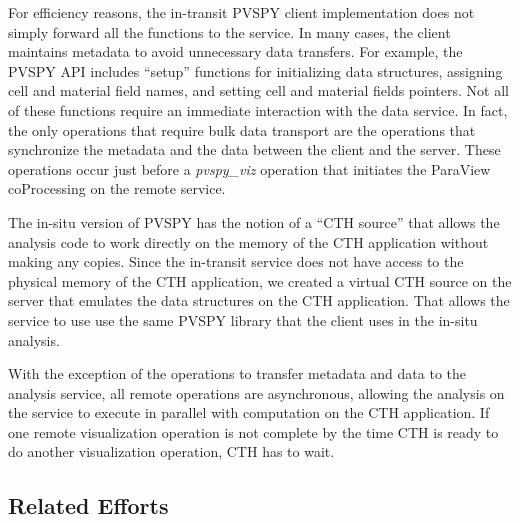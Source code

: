 

For efficiency reasons, the in-transit PVSPY client implementation does not
simply forward all the functions to the service.  In many cases, the client
maintains metadata to avoid unnecessary data transfers.  For example, the PVSPY
API includes ``setup'' functions for initializing data structures, assigning
cell and material field names, and setting cell and material fields pointers.
Not all of these functions require an immediate interaction with the data
service.  In fact, the only operations that require bulk data transport are
the operations that synchronize the metadata and the data between the client 
and the server.  These operations occur just before a \emph{pvspy\_viz} operation
that initiates the ParaView coProcessing on the remote service. 

The in-situ version of PVSPY has the notion of a ``CTH source'' that allows the
analysis code to work directly on the memory of the CTH application without
making any copies.   Since the in-transit service does not have access to the
physical memory of the CTH application, we created a virtual CTH source on the
server that emulates the data structures on the CTH application.  That allows
the service to use use the same PVSPY library that the client uses in the in-situ
analysis.  

With the exception of the operations to transfer metadata and data to the analysis
service, all remote operations are asynchronous, allowing the analysis on the 
service to execute in parallel with computation on the CTH application.  If one
remote visualization operation is not complete by the time CTH is ready to do another
visualization operation, CTH has to wait. 


\subsection{Related Efforts}

